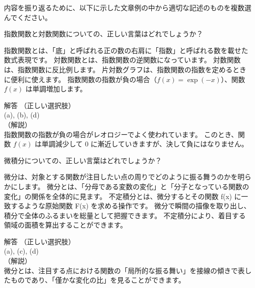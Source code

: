 \documentclass[uplatex,dvipdfmx,a4paper,11pt]{jsarticle}
\begin{document}
内容を振り返るために、以下に示した文章例の中から適切な記述のものを複数選んでください。
\begin{qlist}
	\qitem 指数関数と対数関数についての、正しい言葉はどれでしょうか？
		\begin{qlist2}
			\qitem 指数関数とは、「底」と呼ばれる正の数の右肩に「指数」と呼ばれる数を載せた数式表現です。
			\qitem 対数関数とは、指数関数の逆関数になっています。
			\qitem 対数関数は、指数関数に反比例します。
			\qitem 片対数グラフは、指数関数の指数を定めるときに便利に使えます。
			\qitem 指数関数の指数が負の場合（$f(x)=\exp(-x)$）、関数 $f(x)$ は単調増加します。
		\end{qlist2}
        \vspace{3mm}
        \begin{itembox}[l]{解答}
            （正しい選択肢）\\
            (a), (b), (d)\\
            （解説）\\
            指数関数の指数が負の場合がレオロジーでよく使われています。
            このとき、関数 $f(x)$ は単調減少して 0 に漸近していきますが、決して負にはなりません。
        \end{itembox}
	\qitem 微積分についての、正しい言葉はどれでしょうか？
		\begin{qlist2}
			\qitem 微分は、対象とする関数が注目したい点の周りでどのように振る舞うのかを明らかにします。
			\qitem 微分とは、「分母である変数の変化」と「分子となっている関数の変化」の関係を全体的に見ます。
			\qitem 不定積分とは、微分するとその関数 f(x) に一致するような原始関数 F(x) を求める操作です。
			\qitem 微分で瞬間の描像を取り出し、積分で全体のふるまいを総量として把握できます。
			\qitem 不定積分により、着目する領域の面積を算出することができます。
		\end{qlist2}
        \vspace{3mm}
        \begin{itembox}[l]{解答}
            （正しい選択肢）\\
            (a), (c), (d)\\
            （解説）\\
            微分とは、注目する点における関数の「局所的な振る舞い」を接線の傾きで表したものであり、「僅かな変化の比」を見ることができます。
            

\end{itembox}
\end{qlist}
\end{document}
